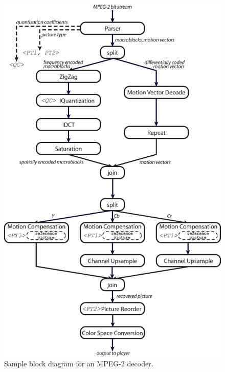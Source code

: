 \begin{figure}[h]
  \begin{center}
    \includegraphics[scale=0.44, angle=0]{./decoder_without_code.eps}
    \caption{Sample block diagram for an MPEG-2 decoder.}
    \label{fig:dec-without-code}
  \end{center}
\end{figure}

